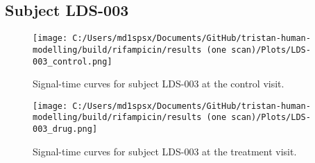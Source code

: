 \documentclass{epflreport}%
\begin{document}
\subsection{Subject LDS{-}003}%
\label{subsec:SubjectLDS{-}003}%

%


\begin{figure}[h!]%
\centering%
\texttt{[image: C:/Users/md1spsx/Documents/GitHub/tristan-human-modelling/build/rifampicin/results (one scan)/Plots/LDS-003\_control.png]}%
\caption{Signal{-}time curves for subject LDS{-}003 at the control visit.}%
\end{figure}

%


\begin{figure}[h!]%
\centering%
\texttt{[image: C:/Users/md1spsx/Documents/GitHub/tristan-human-modelling/build/rifampicin/results (one scan)/Plots/LDS-003\_drug.png]}%
\caption{Signal{-}time curves for subject LDS{-}003 at the treatment visit.}%
\end{figure}
\end{document}
